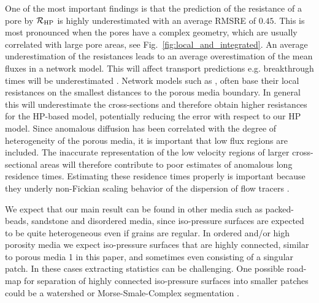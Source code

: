 \documentclass[draft]{agujournal2019}
\begin{document}
One of the most important findings is that the prediction of the resistance of a pore by $\mathcal{R}_{\rm{HP}}$ is highly underestimated with an average RMSRE of $0.45$. This is most pronounced when the pores have a complex geometry, which are usually correlated with large pore areas, see Fig.~\ref{fig:local_and_integrated}. An average underestimation of the resistances leads to an average overestimation of the mean fluxes in a network model. This will affect transport predictions e.g. breakthrough times will be underestimated \cite{dentz_mechanisms_2018}. Network models such as \cite{alim_local_2017}, often base their local resistances on the smallest distances to the porous media boundary. In general this will underestimate the cross-sections and therefore obtain higher resistances for the HP-based model, potentially reducing the error with respect to our HP model. Since anomalous diffusion has been correlated with the degree of heterogeneity of the porous media, it is important that low flux regions are included. The inaccurate representation of the low velocity regions of larger cross-sectional areas will therefore contribute to poor estimates of anomalous long residence times. Estimating these residence times properly is important because they underly non-Fickian scaling behavior of the dispersion of flow tracers \cite{dentz_mechanisms_2018,dentz_delay_2006}.

We expect that our main result can be found in other media such as packed-beads, sandstone and disordered media, since iso-pressure surfaces are expected to be quite heterogeneous even if grains are regular. In ordered and/or high porosity media we expect iso-pressure surfaces that are highly connected, similar to porous media 1 in this paper, and sometimes even consisting of a singular patch. In these cases extracting statistics can be challenging. One possible road-map for separation of highly connected iso-pressure surfaces into smaller patches could be a watershed or Morse-Smale-Complex segmentation \cite{tierny_topology_2018}. 
\end{document}
